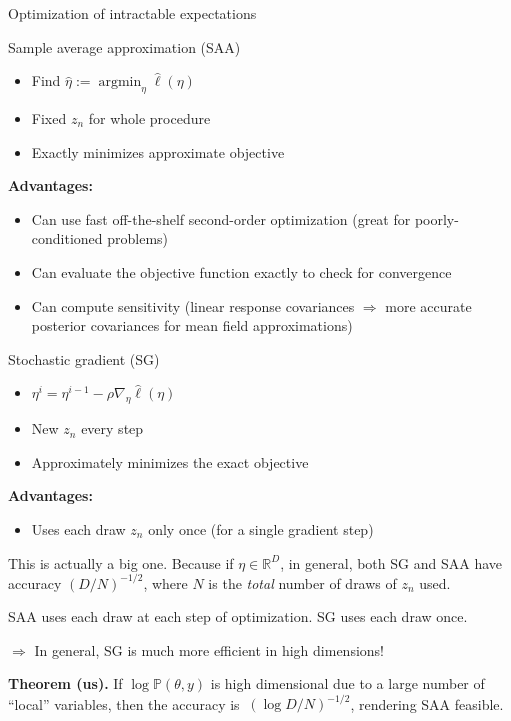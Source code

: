 \documentclass[8pt]{beamer}\usepackage[]{graphicx}\usepackage[]{color}
\def\p#1{\mathbb{P}\left(#1\right)}
\def\y{y}
\def\z{z}
\def\etahat{\hat{\eta}}
\def\ellhat{\hat{\ell}}
\DeclareMathOperator*{\argmin}{\mathrm{argmin}}
\begin{document}
\begin{frame}{Optimization of intractable expectations}

\begin{minipage}[t]{0.45\linewidth}
    Sample average approximation (SAA)
    \begin{itemize}
    \item Find $\etahat := \argmin_{\eta} \ellhat(\eta)$
    \item Fixed $\z_n$ for whole procedure
    \item Exactly minimizes approximate objective
    \end{itemize}

\textbf{Advantages:}
%
\begin{itemize}
%
\item Can use fast off-the-shelf second-order optimization (great for
poorly-conditioned problems)
\item Can evaluate the objective function exactly to check for convergence
\item Can compute sensitivity (linear response covariances $\Rightarrow$
more accurate posterior covariances for mean field approximations)
%
\end{itemize}
%
\end{minipage}
\hfill\vline\hfill
\begin{minipage}[t]{0.45\linewidth}
    Stochastic gradient (SG)
    \begin{itemize}
    \item $\eta^{i} = \eta^{i-1} - \rho \nabla_\eta \ellhat(\eta)$
    \item New $\z_n$ every step
    \item Approximately minimizes the exact objective
    \end{itemize}

\textbf{Advantages:}
%
\begin{itemize}
%
\item Uses each draw $\z_n$ only once (for a single gradient step)
%
\end{itemize}
%
This is actually a big one.  Because if $\eta \in \mathbb{R}^D$,
in general, both
SG and SAA have accuracy $(D / N)^{-1/2}$, where $N$ is the {\em total}
number of draws of $\z_n$ used.

\vspace{1em}
SAA uses each draw at each step of optimization.  SG uses each draw once.
%

$\Rightarrow$ In general, SG is much more efficient in high dimensions!
%
\end{minipage}

\hrulefill

\textbf{Theorem (us).}  If $\log \p{\theta, \y}$ is high dimensional
due to a large number of ``local'' variables, then the accuracy
is $~ (\log D / N)^{-1/2}$, rendering SAA feasible.

\end{frame}
\end{document}
